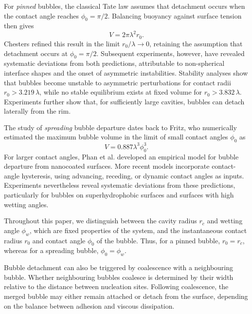 \documentclass[9pt]{extarticle}
\begin{document}
For \emph{pinned} bubbles, the classical Tate law\cite{tate64magnitude} assumes that detachment occurs when the contact angle reaches $\phi_0=\pi/2$. Balancing buoyancy against surface tension then gives
\begin{equation}\label{eqTate}
V=2\pi\lambda^2 r_0.
\end{equation}
Chesters\cite{chesters77analytical} refined this result in the limit $r_0/\lambda\to0$, retaining the assumption that detachment occurs at $\phi_0=\pi/2$. Subsequent experiments, however, have revealed systematic deviations from both predictions\cite{gerlach05quasistatic,lesage13experimental,mori01bubble,sasetty23stability,gunde01measurement}, attributable to non-spherical interface shapes and the onset of asymmetric instabilities. Stability analyses show that bubbles become unstable to asymmetric perturbations for contact radii $r_0>3.219\,\lambda$\cite{michael76equilibrium}, while no stable equilibrium exists at fixed volume for $r_0>3.832\,\lambda$\cite{plateau73statique}. Experiments further show that, for sufficiently large cavities, bubbles can detach laterally from the rim\cite{sasetty23stability}.

The study of \emph{spreading} bubble departure dates back to Fritz\cite{fritz35berechnung}, who numerically estimated the maximum bubble volume in the limit of small contact angles $\phi_0$ as
\begin{equation}\label{eqFritz}
V=0.887\lambda^3\phi_0^3.
\end{equation}
For larger contact angles, Phan et al.\cite{phan09surface} developed an empirical model for bubble departure from nanocoated surfaces. More recent models incorporate contact-angle hysteresis\cite{degennes85wetting}, using advancing, receding\cite{allred21role,demirkir24life}, or dynamic\cite{mukherjee07numerical} contact angles as inputs. Experiments nevertheless reveal systematic deviations from these predictions, particularly for bubbles on superhydrophobic surfaces and surfaces with high wetting angles\cite{huang26effects}.

Throughout this paper, we distinguish between the cavity radius $r_c$ and wetting angle $\phi_w$, which are fixed properties of the system, and the instantaneous contact radius $r_0$ and contact angle $\phi_0$ of the bubble. Thus, for a pinned bubble, $r_0=r_c$, whereas for a spreading bubble, $\phi_0=\phi_w$.

Bubble detachment can also be triggered by coalescence with a neighbouring bubble. Whether neighbouring bubbles coalesce is determined by their width relative to the distance between nucleation sites\cite{bonjour00experimental,raman25electrolytic}. Following coalescence, the merged bubble may either remain attached or detach from the surface, depending on the balance between adhesion and viscous dissipation\cite{demirkir25jump}.
\end{document}
